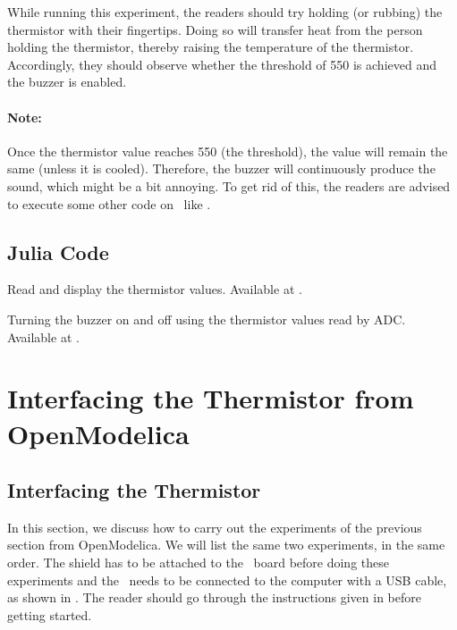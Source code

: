 \begin{enumerate}
        While running this experiment,
        the readers should try holding (or rubbing) the thermistor with their fingertips.
        Doing so will transfer heat from the person holding the
        thermistor, thereby raising the temperature of the thermistor.
        Accordingly, they should observe whether the threshold of 550 is achieved
        and the buzzer is enabled.

        \paragraph{Note:} Once the thermistor value reaches 550 (the threshold), the value will remain the same
        (unless it is cooled). Therefore, the buzzer will continuously produce the sound, which might be
        a bit annoying. To get rid of this, the readers are advised to
        execute some other code on \arduino\ like .

\end{enumerate}

\subsection{Julia Code}
\label{sec:therm-julia-code}

\begin{juliacode}
   {Read and display
    the thermistor values. Available at
    .}
  \label{julia:therm-read}
  
\end{juliacode}

\begin{juliacode}
  {Turning the buzzer on and off using the thermistor values read by
    ADC.  Available at .}
  \label{julia:therm-buzzer}
  
\end{juliacode}

\section{Interfacing the Thermistor from OpenModelica}
\subsection{Interfacing the Thermistor}
In this section, we discuss how to carry out the experiments of the
previous section from OpenModelica.  We will list the same two experiments,
in the same order.  The shield has to be attached to the \arduino\ board
before doing these experiments and the \arduino\ needs to be connected to the computer
with a USB cable, as shown in .
The reader should go through the instructions given in
 before getting started.

